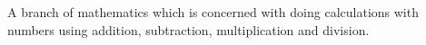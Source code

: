 A branch of mathematics which is concerned with doing calculations with numbers 
using addition, subtraction, multiplication and division.